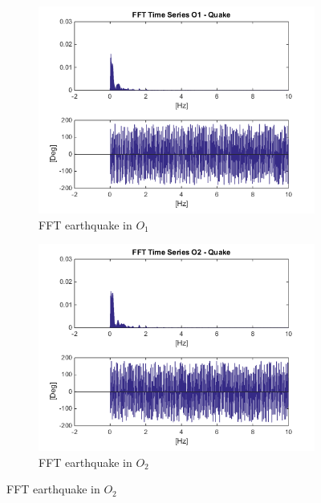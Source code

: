 \documentclass[10pt,a4paper,final]{report}
\begin{document}
\begin{figure}[h]
        \centering
        \begin{subfigure}[t]{0.5\textwidth}
                \includegraphics[width=\textwidth]{earthquake2}
                \caption{FFT earthquake in $O_1$}
                \label{fig:earthquake2}
        \end{subfigure}%
        \begin{subfigure}[t]{0.5\textwidth}
                \includegraphics[width=\textwidth]{earthquake3}
                \caption{FFT earthquake in $O_2$}
                \label{fig:earthquake3}
        \end{subfigure}
         \label{fig:earthquake23}
\end{figure}
\end{document}
